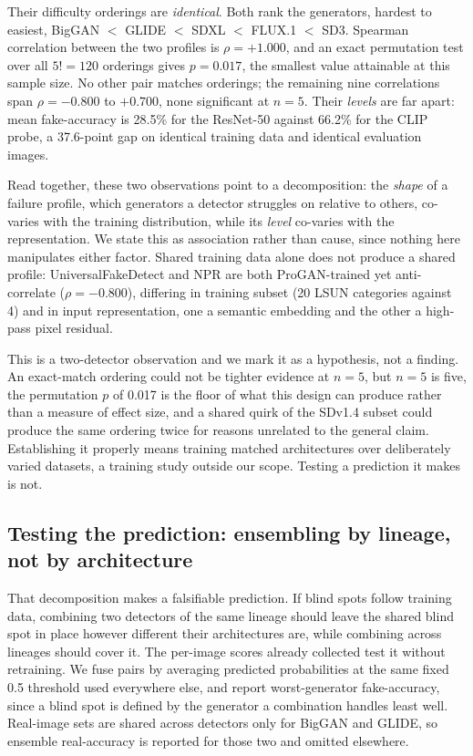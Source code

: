 \documentclass[3p,times,procedia]{elsarticle}
\begin{document}
Their difficulty orderings are \emph{identical}. Both rank the generators,
hardest to easiest, BigGAN $<$ GLIDE $<$ SDXL $<$ FLUX.1 $<$ SD3. Spearman
correlation between the two profiles is $\rho=+1.000$, and an exact
permutation test over all $5!=120$ orderings gives $p=0.017$, the smallest
value attainable at this sample size. No other pair matches orderings; the
remaining nine correlations span $\rho=-0.800$ to $+0.700$, none
significant at $n=5$. Their \emph{levels} are far apart: mean
fake-accuracy is 28.5\% for the ResNet-50 against 66.2\% for the CLIP
probe, a 37.6-point gap on identical training data and identical
evaluation images.

Read together, these two observations point to a decomposition: the
\emph{shape} of a failure profile, which generators a detector struggles
on relative to others, co-varies with the training distribution, while its
\emph{level} co-varies with the representation. We state this as
association rather than cause, since nothing here manipulates either
factor. Shared training data alone does not produce a shared profile: UniversalFakeDetect and NPR
are both ProGAN-trained yet anti-correlate ($\rho=-0.800$), differing in
training subset (20 LSUN categories against 4) and in input
representation, one a semantic embedding and the other a high-pass pixel
residual.

This is a two-detector observation and we mark it as a hypothesis, not a
finding. An exact-match ordering could not be tighter evidence at $n=5$,
but $n=5$ is five, the permutation $p$ of 0.017 is the floor of what this
design can produce rather than a measure of effect size, and a shared
quirk of the SDv1.4 subset could produce the same ordering twice for
reasons unrelated to the general claim. Establishing it properly means
training matched architectures over deliberately varied datasets, a
training study outside our scope. Testing a prediction it makes is not.

\subsection{Testing the prediction: ensembling by lineage, not by
architecture}
\label{sec:ensemble}

That decomposition makes a falsifiable prediction. If blind spots follow
training data, combining two detectors of the same lineage should leave
the shared blind spot in place however different their architectures are,
while combining across lineages should cover it. The per-image scores
already collected test it without retraining. We fuse pairs by averaging
predicted probabilities at the same fixed 0.5 threshold used everywhere
else, and report worst-generator fake-accuracy, since a blind spot is
defined by the generator a combination handles least well. Real-image sets
are shared across detectors only for BigGAN and GLIDE, so ensemble
real-accuracy is reported for those two and omitted elsewhere.
\end{document}
